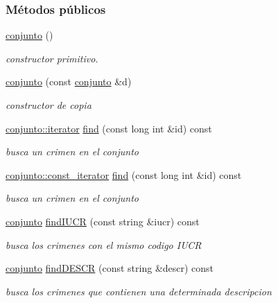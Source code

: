 \subsubsection*{Métodos públicos}
\begin{DoxyCompactItemize}
\item 
\hyperlink{classconjunto_a16d987f42c679efab01748178ba45891}{conjunto} ()
\begin{DoxyCompactList}\small\item\em constructor primitivo. \end{DoxyCompactList}\item 
\hyperlink{classconjunto_ab0944b1f9a0c959ca314ce0debd5def9}{conjunto} (const \hyperlink{classconjunto}{conjunto} \&d)
\begin{DoxyCompactList}\small\item\em constructor de copia \end{DoxyCompactList}\item 
\hyperlink{classconjunto_1_1iterator}{conjunto\+::iterator} \hyperlink{classconjunto_a2459d07b15a25a474f1be8dc0038feb5}{find} (const long int \&id) const 
\begin{DoxyCompactList}\small\item\em busca un crimen en el conjunto \end{DoxyCompactList}\item 
\hyperlink{classconjunto_1_1const__iterator}{conjunto\+::const\+\_\+iterator} \hyperlink{classconjunto_a356285fe75238fd67673eba9c6bf6d24}{find} (const long int \&id) const 
\begin{DoxyCompactList}\small\item\em busca un crimen en el conjunto \end{DoxyCompactList}\item 
\hyperlink{classconjunto}{conjunto} \hyperlink{classconjunto_a2ca2a7b59bce8369e9d9ccc1c7be9614}{find\+I\+U\+C\+R} (const string \&iucr) const 
\begin{DoxyCompactList}\small\item\em busca los crimenes con el mismo codigo I\+U\+C\+R \end{DoxyCompactList}\item 
\hyperlink{classconjunto}{conjunto} \hyperlink{classconjunto_afff3e7f4b3d00f422dd7ab2fec935378}{find\+D\+E\+S\+C\+R} (const string \&descr) const 
\begin{DoxyCompactList}\small\item\em busca los crimenes que contienen una determinada descripcion \end{DoxyCompactList}\item 

\end{DoxyCompactItemize}
